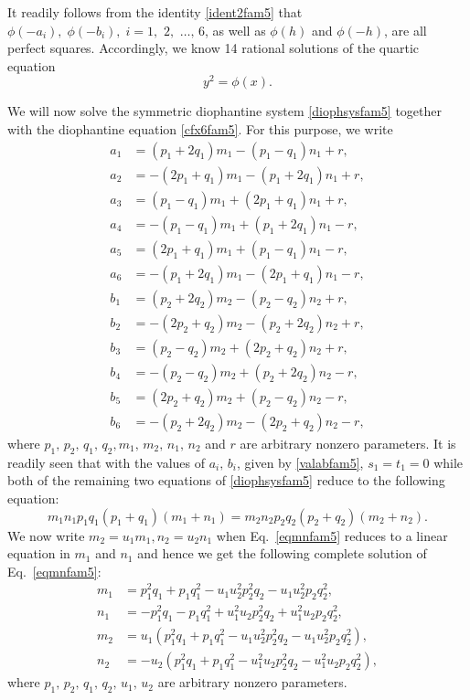 \documentclass[11pt, leqno]{article}
\begin{document}
It  readily follows  from the identity  \eqref{ident2fam5} that $\phi(-a_i),\; \phi(-b_i),\; i=1,\,\,2,$  $\ldots,\,6$, as well as $\phi(h)$ and $ \phi(-h)$, are all perfect squares. Accordingly,  we know 14 rational solutions of the quartic equation
\begin{equation}
y^2=\phi(x) \label{ecfam5}.
\end{equation}


We will now solve the symmetric diophantine system \eqref{diophsysfam5}
together with the diophantine equation \eqref{cfx6fam5}. For this purpose, 
we write
\begin{equation}
\begin{aligned}
a_1 &= (p_1+2q_1)m_1-(p_1-q_1)n_1+r, \\a_2 &= -(2p_1+q_1)m_1-(p_1+2q_1)n_1+r,\\
 a_3 &= (p_1-q_1)m_1+(2p_1+q_1)n_1+r, \\a_4 &= -(p_1-q_1)m_1+(p_1+2q_1)n_1-r,\\
 a_5 &= (2p_1+q_1)m_1+(p_1-q_1)n_1-r, \\a_6 &= -(p_1+2q_1)m_1-(2p_1+q_1)n_1-r,\\
b_1 &= (p_2+2q_2)m_2-(p_2-q_2)n_2+r, \\b_2 &= -(2p_2+q_2)m_2-(p_2+2q_2)n_2+r,\\
 b_3 &= (p_2-q_2)m_2+(2p_2+q_2)n_2+r, \\b_4 &= -(p_2-q_2)m_2+(p_2+2q_2)n_2-r,\\
 b_5 &= (2p_2+q_2)m_2+(p_2-q_2)n_2-r, \\b_6 &= -(p_2+2q_2)m_2-(2p_2+q_2)n_2-r, 
\end{aligned}
\label{valabfam5}
\end{equation}
where $p_1,\,p_2,\,q_1,\,q_2,m_1,\,m_2,\,n_1,\,n_2$ and $r$ are arbitrary nonzero parameters. It is readily seen that with the values of $a_i,\,b_i$, given by \eqref{valabfam5}, $s_1=t_1=0$ while both of the remaining two equations of \eqref{diophsysfam5} reduce to the following equation:
\begin{equation}
m_1n_1p_1q_1(p_1+q_1)(m_1+n_1) = m_2n_2p_2q_2(p_2+q_2)(m_2+n_2). \label{eqmnfam5}
\end{equation}
We now write $m_2=u_1m_1,n_2=u_2n_1$ when Eq.~\eqref{eqmnfam5} reduces to a linear equation in $m_1$ and $n_1$  and hence we get the following complete solution of Eq.~\eqref{eqmnfam5}:
\begin{equation}
\begin{aligned}
m_1 &= p_1^2q_1+p_1q_1^2-u_1u_2^2p_2^2q_2-u_1u_2^2p_2q_2^2,\\
 n_1 &= -p_1^2q_1-p_1q_1^2+u_1^2u_2p_2^2q_2+u_1^2u_2p_2q_2^2,\\
m_2 &= u_1(p_1^2q_1+p_1q_1^2-u_1u_2^2p_2^2q_2-u_1u_2^2p_2q_2^2), \\
n_2 &= -u_2(p_1^2q_1+p_1q_1^2-u_1^2u_2p_2^2q_2-u_1^2u_2p_2q_2^2),
\end{aligned} \label{valmnfam5}
\end{equation}
where $p_1,\,p_2,\,q_1,\,q_2,\,u_1,\,u_2$ are arbitrary nonzero parameters.
\end{document}
